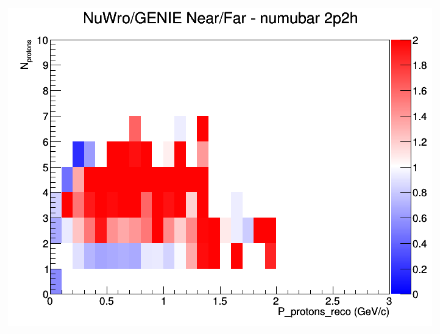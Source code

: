 \documentclass[12pt]{article}
\begin{document}
\begin{figure}[h]
\endminipage
{}
\includegraphics[width=\linewidth]{eff_N_P/GAr/protons/ratios/2p2h_NuWro_GENIE_numubar_NF_N_P.png}
\endminipage
\newline
\end{figure}
\clearpage
\end{document}
